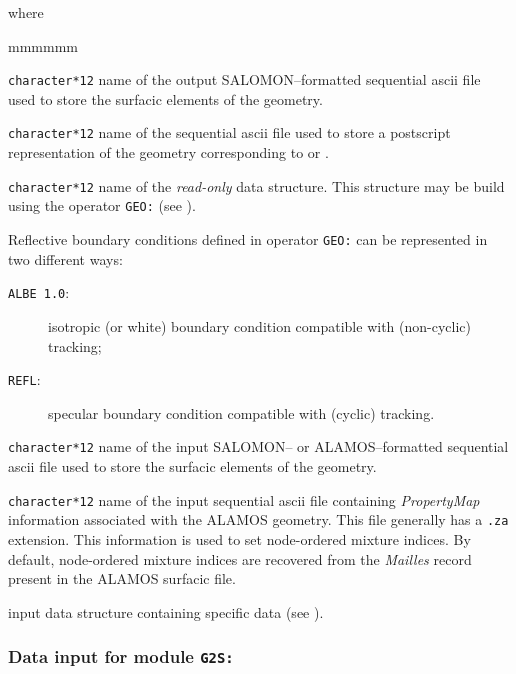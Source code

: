 \noindent where
\begin{ListeDeDescription}{mmmmmm}

\item[\dusa{SURFIL}] \texttt{character*12} name of the output SALOMON--formatted sequential {\sc ascii}
file used to store the surfacic elements of the geometry.

\item[\dusa{PSFIL}] \texttt{character*12} name of the sequential {\sc ascii}
file used to store a postscript representation of the geometry corresponding to  or .

\item[\dusa{GEONAM}] {\tt character*12} name of the {\sl read-only}  data
structure. This structure may be build using the operator {\tt GEO:} (see ).

Reflective boundary conditions defined in operator {\tt GEO:} can be represented in two different ways:
\vspace{-0.2cm}
\begin{description}
\item[{\tt ALBE 1.0}:] isotropic (or white) boundary condition compatible with  (non-cyclic) tracking;
\item[{\tt REFL}:] specular boundary condition compatible with  (cyclic) tracking.
\end{description}

\item[\dusa{SURFIL\_IN}] \texttt{character*12} name of the input SALOMON-- or ALAMOS--formatted sequential {\sc ascii}
file used to store the surfacic elements of the geometry.

\item[\dusa{ZAFIL\_IN}] \texttt{character*12} name of the input sequential {\sc ascii} file containing {\sl PropertyMap}
information associated with the ALAMOS geometry. This file generally has a {\tt .za} extension. This information is used to
set node-ordered mixture indices. By default, node-ordered mixture indices are recovered from the {\sl Mailles} record present
in the ALAMOS surfacic file.

\item[\dusa{G2S\_data}] input data structure containing specific data (see ).
\end{ListeDeDescription}

\subsubsection{Data input for module {\tt G2S:}}\label{sect:descG2S}

